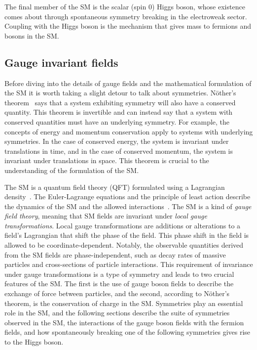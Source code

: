 The final member of the SM is the scalar (spin 0) Higgs boson, whose existence comes about through spontaneous symmetry breaking in the electroweak sector. Coupling with the Higgs boson is the mechanism that gives mass to fermions and bosons in the SM.

\subsection{Gauge invariant fields}
\label{sec:guage_fields}

Before diving into the details of gauge fields and the mathematical formulation of the SM it is worth taking a slight detour to talk about symmetries. N\"{o}ther's theorem~\cite{noether} says that a system exhibiting symmetry will also have a conserved quantity. This theorem is invertible and can instead say that a system with conserved quantities must have an underlying symmetry. For example, the concepts of energy and momentum conservation apply to systems with underlying symmetries. In the case of conserved energy, the system is invariant under translations in time, and in the case of conserved momentum, the system is invariant under translations in space. This theorem is crucial to the understanding of the formulation of the SM.

The SM is a quantum field theory (QFT) formulated using a Lagrangian density~\cite{mandl_shaw_2011}. The Euler-Lagrange equations and the principle of least action describe the dynamics of the SM and the allowed interactions~\cite{fox_2013}. The SM is a kind of \textit{gauge field theory}, meaning that SM fields are invariant under \textit{local gauge transformations}. Local gauge transformations are additions or alterations to a field's Lagrangian that shift the phase of the field. This phase shift in the field is allowed to be coordinate-dependent. Notably, the observable quantities derived from the SM fields are phase-independent, such as decay rates of massive particles and cross-sections of particle interactions. This requirement of invariance under gauge transformations is a type of symmetry and leads to two crucial features of the SM. The first is the use of gauge boson fields to describe the exchange of force between particles, and the second, according to N\"{o}ther's theorem, is the conservation of charge in the SM. Symmetries play an essential role in the SM, and the following sections describe the suite of symmetries observed in the SM, the interactions of the gauge boson fields with the fermion fields, and how spontaneously breaking one of the following symmetries gives rise to the Higgs boson.

